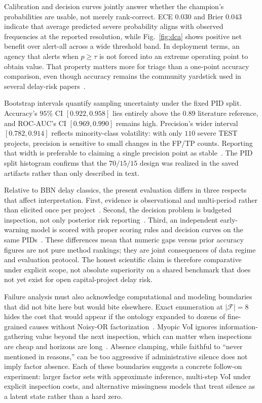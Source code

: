 Calibration and decision curves jointly answer whether the champion's probabilities are usable, not merely rank-correct. ECE $0.030$ and Brier $0.043$ indicate that average predicted severe probability aligns with observed frequencies at the reported resolution, while Fig.~\ref{fig:dca} shows positive net benefit over alert-all across a wide threshold band. In deployment terms, an agency that alerts when $p{\geq}\tau$ is not forced into an extreme operating point to obtain value. That property matters more for triage than a one-point accuracy comparison, even though accuracy remains the community yardstick used in several delay-risk papers~\cite{Vickers2006,GneitingRaftery2007,Khodabakhshian2025,Tagharobi2025}.

Bootstrap intervals quantify sampling uncertainty under the fixed PID split. Accuracy's $95\%$ CI $[0.922,0.958]$ lies entirely above the $0.89$ literature reference, and ROC-AUC's CI $[0.969,0.990]$ remains high. Precision's wider interval $[0.782,0.914]$ reflects minority-class volatility: with only $110$ severe TEST projects, precision is sensitive to small changes in the FP/TP counts. Reporting that width is preferable to claiming a single precision point as stable~\cite{Hand2009,Saito2015}. The PID split histogram confirms that the $70/15/15$ design was realized in the saved artifacts rather than only described in text.

Relative to BBN delay classics, the present evaluation differs in three respects that affect interpretation. First, evidence is observational and multi-period rather than elicited once per project~\cite{Luu2009,Khodabakhshian2025}. Second, the decision problem is budgeted inspection, not only posterior risk reporting~\cite{Memarzadeh2016,Yuan2021}. Third, an independent early-warning model is scored with proper scoring rules and decision curves on the same PIDs~\cite{Gneiting2007,Vickers2006}. These differences mean that numeric gaps versus prior accuracy figures are not pure method rankings; they are joint consequences of data regime and evaluation protocol. The honest scientific claim is therefore comparative under explicit scope, not absolute superiority on a shared benchmark that does not yet exist for open capital-project delay risk.

Failure analysis must also acknowledge computational and modeling boundaries that did not bite here but would bite elsewhere. Exact enumeration at $|\mathcal{F}|{=}8$ hides the cost that would appear if the ontology expanded to dozens of fine-grained causes without Noisy-OR factorization~\cite{Heckerman1996}. Myopic VoI ignores information-gathering value beyond the next inspection, which can matter when inspections are cheap and horizons are long~\cite{Memarzadeh2016,Fauriat2020}. Absence clamping, while faithful to ``never mentioned in reasons,'' can be too aggressive if administrative silence does not imply factor absence. Each of these boundaries suggests a concrete follow-on experiment: larger factor sets with approximate inference, multi-step VoI under explicit inspection costs, and alternative missingness models that treat silence as a latent state rather than a hard zero.

